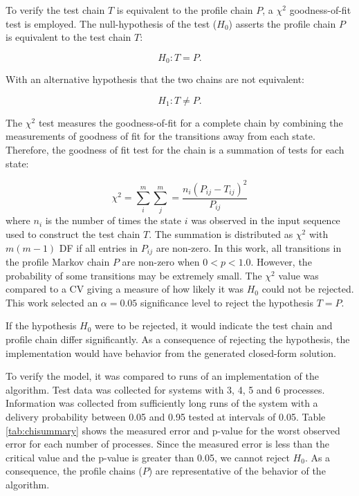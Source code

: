 To verify the test chain $T$ is equivalent to the profile chain $P$, a $\chi^2$ goodness-of-fit test is employed.
The null-hypothesis of the test ($H_{0}$) asserts the profile chain $P$ is equivalent to the test chain $T$:

\begin{equation} H_{0}: T = P.\end{equation}

With an alternative hypothesis that the two chains are not equivalent:

\begin{equation} H_{1}: T \neq P.\end{equation}

The $\chi^2$ test measures the goodness-of-fit for a complete chain by combining the measurements of goodness of fit for the transitions away from each state.
Therefore, the goodness of fit test for the chain is a summation of tests for each state:\cite{MARKOV3}

\begin{equation} \chi^2 = \sum_{i}^{m} \sum_{j}^{m} = \frac{n_{i}(P_{ij}-T_{ij})^2}{P_{ij}} \end{equation}%
where $n_{i}$ is the number of times the state $i$ was observed in the input sequence used to construct the test chain $T$.
The summation is distributed as $\chi^2$ with $m(m-1)$ \ac{DF} if all entries in $P_{ij}$ are non-zero.
In this work, all transitions in the profile Markov chain $P$ are non-zero when $0<p<1.0$.
However, the probability of some transitions may be extremely small.
The $\chi^2$ value was compared to a \ac{CV} giving a measure of how likely it was $H_{0}$ could not be rejected.
This work selected an $\alpha = 0.05$ significance level to reject the hypothesis $T=P$.

If the hypothesis $H_{0}$ were to be rejected, it would indicate the test chain and profile chain differ significantly.
As a consequence of rejecting the hypothesis, the implementation would have behavior from the generated closed-form solution.

To verify the model, it was compared to runs of an implementation of the algorithm.
Test data was collected for systems with 3, 4, 5 and 6 processes.
Information was collected from sufficiently long runs of the system with a delivery probability between 0.05 and 0.95 tested at intervals of 0.05.
Table \ref{tab:chisummary} shows the measured error and p-value for the worst observed error for each number of processes.
Since the measured error is less than the critical value and the p-value is greater than 0.05, we cannot reject $H_0$. 
As a consequence, the profile chains ($P$) are representative of the behavior of the algorithm.

